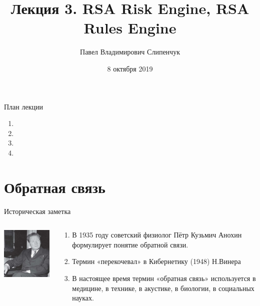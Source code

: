 


\title{Лекция 3. RSA Risk Engine, RSA Rules Engine}
\date{8 октября 2019}
\author{Павел Владимирович Слипенчук}


  \maketitle
    
\begin{frame}{План лекции}
    \begin{enumerate}
		\item {}
		\item {}
		\item {}
		\item {}
	\end{enumerate}
\end{frame}

\section{Обратная связь}\label{section:feedback}

\begin{frame}{Историческая заметка}
	\begin{columns}
		\begin{column}{0.5\textwidth}
			\includegraphics[width=5cm]{../pic/anohin.jpg}
		\end{column}
		\begin{column}{0.6\textwidth}
			\begin{enumerate}
				\item В 1935 году советский физиолог
				Пётр Кузьмич Анохин формулирует понятие обратной связи.
				\item Термин «перекочевал» в Кибернетику (1948) Н.Винера
				\item В настоящее время термин «обратная связь» используется в медицине, в технике, в акустике, в биологии, в социальных науках.
			\end{enumerate}
		\end{column}
	\end{columns}
\end{frame}

